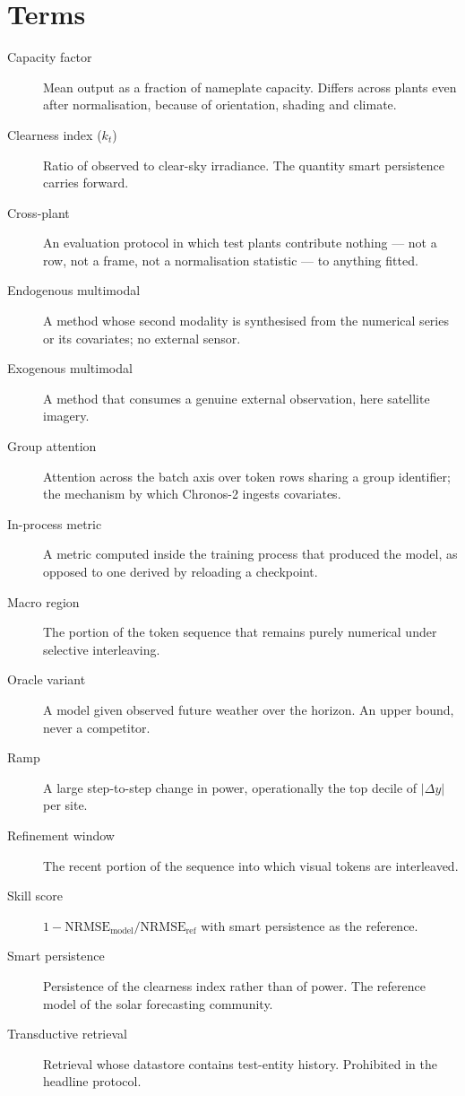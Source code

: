 \section{Terms}

\begin{description}
  \item[Capacity factor] Mean output as a fraction of nameplate capacity. Differs across
    plants even after normalisation, because of orientation, shading and climate.
  \item[Clearness index ($k_t$)] Ratio of observed to clear-sky irradiance. The quantity
    smart persistence carries forward.
  \item[Cross-plant] An evaluation protocol in which test plants contribute nothing --- not a
    row, not a frame, not a normalisation statistic --- to anything fitted.
  \item[Endogenous multimodal] A method whose second modality is synthesised from the
    numerical series or its covariates; no external sensor.
  \item[Exogenous multimodal] A method that consumes a genuine external observation, here
    satellite imagery.
  \item[Group attention] Attention across the batch axis over token rows sharing a group
    identifier; the mechanism by which Chronos-2 ingests covariates.
  \item[In-process metric] A metric computed inside the training process that produced the
    model, as opposed to one derived by reloading a checkpoint.
  \item[Macro region] The portion of the token sequence that remains purely numerical under
    selective interleaving.
  \item[Oracle variant] A model given observed future weather over the horizon. An upper
    bound, never a competitor.
  \item[Ramp] A large step-to-step change in power, operationally the top decile of
    $|\Delta y|$ per site.
  \item[Refinement window] The recent portion of the sequence into which visual tokens are
    interleaved.
  \item[Skill score] $1 - \mathrm{NRMSE}_{\text{model}}/\mathrm{NRMSE}_{\text{ref}}$ with
    smart persistence as the reference.
  \item[Smart persistence] Persistence of the clearness index rather than of power. The
    reference model of the solar forecasting community.
  \item[Transductive retrieval] Retrieval whose datastore contains test-entity history.
    Prohibited in the headline protocol.
\end{description}


